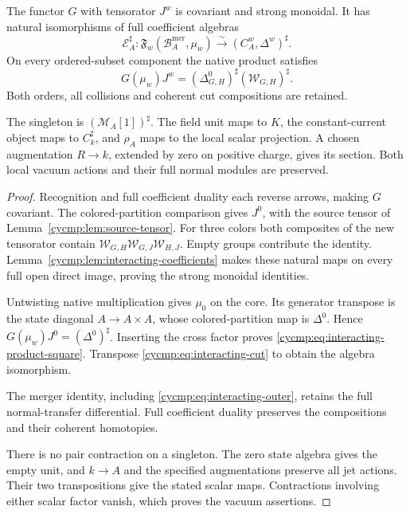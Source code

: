 \begin{theorem}\label{cycmp:thm:interacting-realization}
The functor $G$ with tensorator $J^w$ is covariant and strong monoidal.
It has natural isomorphisms of full coefficient algebras
\[
 \mathscr E_A^\sharp:
 \mathfrak F_w(\mathcal B_A^{\mathrm{mer}},\mu_w)
          \xrightarrow{\sim}(C_A^w,\Delta^w)^\sharp.
\]
On every ordered-subset component the native product satisfies
\begin{equation}\label{cycmp:eq:interacting-product-square}
 G(\mu_w)J^w=(\Delta^0_{G,H})^\sharp
                                  (\mathcal W_{G,H})^\sharp.
\end{equation}
Both orders, all collisions and coherent cut compositions are retained.

The singleton is $(\mathscr M_A[1])^\sharp$. The field unit maps to
$K$, the constant-current object maps to $C_k^\sharp$, and $\rho_A$
maps to the local scalar projection. A chosen augmentation $R\to k$,
extended by zero on positive charge, gives its section.
Both local vacuum actions and their full normal modules are preserved.
\end{theorem}

\begin{proof}
Recognition and full coefficient duality each reverse arrows, making
$G$ covariant. The colored-partition comparison gives $J^0$, with
the source tensor of Lemma~\ref{cycmp:lem:source-tensor}.
For three colors both composites of the new tensorator contain
$\mathcal W_{G,H}\mathcal W_{G,J}\mathcal W_{H,J}$.
Empty groups contribute the identity. Lemma~\ref{cycmp:lem:interacting-coefficients}
makes these natural maps on every full open direct image, proving
the strong monoidal identities.

Untwisting native multiplication gives $\mu_0$ on the core. Its
generator transpose is the state diagonal $A\to A\times A$, whose
colored-partition map is $\Delta^0$. Hence
$G(\mu_w)J^0=(\Delta^0)^\sharp$. Inserting the cross factor proves
\eqref{cycmp:eq:interacting-product-square}. Transpose
\eqref{cycmp:eq:interacting-cut} to obtain the algebra isomorphism.

The merger identity, including \eqref{cycmp:eq:interacting-outer},
retains the full normal-transfer differential. Full coefficient
duality preserves the compositions and their coherent homotopies.

There is no pair contraction on a singleton. The zero state algebra
gives the empty unit, and $k\to A$ and the specified augmentations
preserve all jet actions. Their two transpositions give the stated
scalar maps. Contractions involving either scalar factor vanish,
which proves the vacuum assertions.
\end{proof}

